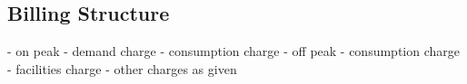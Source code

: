 \subsection{Billing Structure}
- on peak
    - demand charge
    - consumption charge 
- off peak
    - consumption charge 
- facilities charge
- other charges as given

